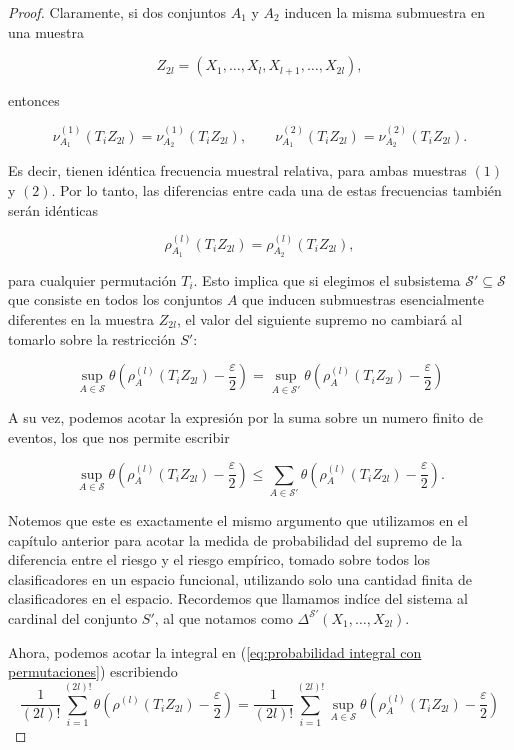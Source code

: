 \documentclass{report}
\begin{document}
\begin{proof}
Claramente, si dos conjuntos \( A_1 \) y \( A_2 \) inducen la misma submuestra en una muestra 

\[
Z_{2l} = (X_1, \dots, X_l, X_{l+1}, \dots, X_{2l}),
\]

entonces

\[
\nu^{(1)}_{A_1}(T_i Z_{2l}) = \nu^{(1)}_{A_2}(T_i Z_{2l}), \qquad \nu^{(2)}_{A_1}(T_i Z_{2l}) = \nu^{(2)}_{A_2}(T_i Z_{2l}).
\]

Es decir, tienen idéntica frecuencia muestral relativa, para ambas muestras $(1)$ y $(2)$. Por lo tanto, las diferencias entre cada una de estas frecuencias también serán idénticas

\[
\rho^{(l)}_{A_1}(T_i Z_{2l}) = \rho^{(l)}_{A_2}(T_i Z_{2l}),
\]

para cualquier permutación \( T_i \). Esto implica que si elegimos el subsistema \( \mathcal{S}' \subseteq \mathcal{S} \)
 que consiste en todos los conjuntos \( A \) que inducen submuestras esencialmente diferentes en la muestra \( Z_{2l} \),
el valor del siguiente supremo no cambiará al tomarlo sobre la restricción $S'$:

\[
\sup_{A \in \mathcal{S}} \theta \left( \rho^{(l)}_A(T_i Z_{2l}) - \frac{\varepsilon}{2} \right) = 
\sup_{A \in \mathcal{S}'} \theta \left( \rho^{(l)}_A(T_i Z_{2l}) - \frac{\varepsilon}{2} \right) 
\]

A su vez, podemos acotar la expresión por la suma sobre un numero finito de eventos, los que nos permite escribir

\[
\sup_{A \in \mathcal{S}} \theta \left( \rho^{(l)}_A(T_i Z_{2l}) - \frac{\varepsilon}{2} \right)
\leq \sum_{A \in \mathcal{S}'} \theta \left( \rho^{(l)}_A(T_i Z_{2l}) - \frac{\varepsilon}{2} \right).
\]

Notemos que este es exactamente el mismo argumento que utilizamos en el capítulo anterior para acotar la medida de probabilidad del supremo de la diferencia
entre el riesgo y el riesgo empírico, tomado sobre todos los clasificadores en un espacio funcional, utilizando solo una cantidad finita de clasificadores en el espacio.
Recordemos que llamamos indíce del sistema al cardinal del conjunto $S'$, al que notamos como $ \Delta^{\mathcal{S'}}(X_1, \dots, X_{2l})$.\newline

Ahora, podemos acotar la integral en (\ref{eq:probabilidad integral con permutaciones}) escribiendo
\[
\frac{1}{(2l)!} \sum_{i=1}^{(2l)!} \theta \left(  \rho^{(l)}(T_i Z_{2l}) - \frac{\varepsilon}{2}  \right) 
= \frac{1}{(2l)!} \sum_{i=1}^{(2l)!} \sup_{A \in \mathcal{S}} \theta \left(  \rho^{(l)}_A(T_i Z_{2l}) - \frac{\varepsilon}{2}  \right)
\]


\end{proof}
\end{document}
